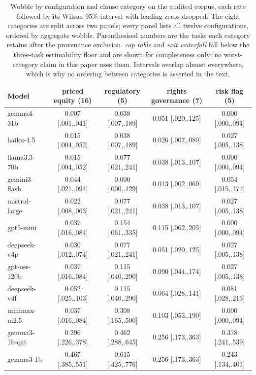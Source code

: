 \begin{table}[t]
\setlength{\tabcolsep}{4pt}
\begin{tabular}{lcccc}
\toprule
Model & priced equity (16) & regulatory (5) & rights governance (7) & risk flag (5) \\
\midrule
gemma4-31b & 0.007 [.001,.041] & 0.038 [.007,.189] & 0.051 [.020,.125] & 0.000 [.000,.094] \\
haiku-4.5 & 0.015 [.004,.052] & 0.038 [.007,.189] & 0.026 [.007,.089] & 0.027 [.005,.138] \\
llama3.3-70b & 0.015 [.004,.052] & 0.077 [.021,.241] & 0.038 [.013,.107] & 0.000 [.000,.094] \\
gemini3-flash & 0.044 [.021,.094] & 0.000 [.000,.129] & 0.013 [.002,.069] & 0.054 [.015,.177] \\
mistral-large & 0.022 [.008,.063] & 0.077 [.021,.241] & 0.038 [.013,.107] & 0.027 [.005,.138] \\
gpt5-mini & 0.037 [.016,.084] & 0.154 [.061,.335] & 0.115 [.062,.205] & 0.000 [.000,.094] \\
deepseek-v4p & 0.030 [.012,.074] & 0.077 [.021,.241] & 0.051 [.020,.125] & 0.027 [.005,.138] \\
gpt-oss-120b & 0.037 [.016,.084] & 0.115 [.040,.290] & 0.090 [.044,.174] & 0.027 [.005,.138] \\
deepseek-v4f & 0.052 [.025,.103] & 0.115 [.040,.290] & 0.064 [.028,.141] & 0.081 [.028,.213] \\
minimax-m2.5 & 0.037 [.016,.084] & 0.308 [.165,.500] & 0.103 [.053,.190] & 0.000 [.000,.094] \\
gemma3-1b-qat & 0.296 [.226,.378] & 0.462 [.288,.645] & 0.256 [.173,.363] & 0.378 [.241,.539] \\
gemma3-1b & 0.467 [.385,.551] & 0.615 [.425,.776] & 0.256 [.173,.363] & 0.243 [.134,.401] \\
\bottomrule
\end{tabular}
\caption{Wobble by configuration and clause category on the audited corpus, each rate followed by its Wilson 95\% interval with leading zeros dropped. The eight categories are split across two panels; every panel lists all twelve configurations, ordered by aggregate wobble. Parenthesised numbers are the tasks each category retains after the provenance exclusion. \emph{cap table} and \emph{exit waterfall} fall below the three-task estimability floor and are shown for completeness only: no worst-category claim in this paper uses them. Intervals overlap almost everywhere, which is why no ordering between categories is asserted in the text.}
\label{tab:categories}
\end{table}
